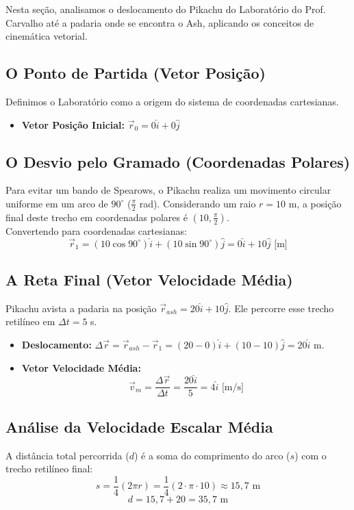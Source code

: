 \documentclass[11pt,a4paper]{article}
\begin{document}
Nesta seção, analisamos o deslocamento do Pikachu do Laboratório do Prof. Carvalho até a padaria onde se encontra o Ash, aplicando os conceitos de cinemática vetorial.

\subsection{O Ponto de Partida (Vetor Posição)}
Definimos o Laboratório como a origem do sistema de coordenadas cartesianas.
\begin{itemize}
    \item \textbf{Vetor Posição Inicial:} $\vec{r}_0 = 0\hat{i} + 0\hat{j}$
\end{itemize}

\subsection{O Desvio pelo Gramado (Coordenadas Polares)}
Para evitar um bando de Spearows, o Pikachu realiza um movimento circular uniforme em um arco de $90^\circ$ ($\frac{\pi}{2}$ rad).
Considerando um raio $r = 10$ m, a posição final deste trecho em coordenadas polares é $(10, \frac{\pi}{2})$.
\\
Convertendo para coordenadas cartesianas:
$$\vec{r}_1 = (10 \cos 90^\circ)\hat{i} + (10 \sin 90^\circ)\hat{j} = 0\hat{i} + 10\hat{j} \text{ [m]}$$

\subsection{A Reta Final (Vetor Velocidade Média)}
Pikachu avista a padaria na posição $\vec{r}_{ash} = 20\hat{i} + 10\hat{j}$. Ele percorre esse trecho retilíneo em $\Delta t = 5$ s.
\begin{itemize}
    \item \textbf{Deslocamento:} $\Delta \vec{r} = \vec{r}_{ash} - \vec{r}_1 = (20-0)\hat{i} + (10-10)\hat{j} = 20\hat{i}$ m.
    \item \textbf{Vetor Velocidade Média:} 
    $$\vec{v}_m = \frac{\Delta \vec{r}}{\Delta t} = \frac{20\hat{i}}{5} = 4\hat{i} \text{ [m/s]}$$
\end{itemize}

\subsection{Análise da Velocidade Escalar Média}
A distância total percorrida ($d$) é a soma do comprimento do arco ($s$) com o trecho retilíneo final:
$$s = \frac{1}{4}(2\pi r) = \frac{1}{4}(2 \cdot \pi \cdot 10) \approx 15,7 \text{ m}$$
$$d = 15,7 + 20 = 35,7 \text{ m}$$
\end{document}
